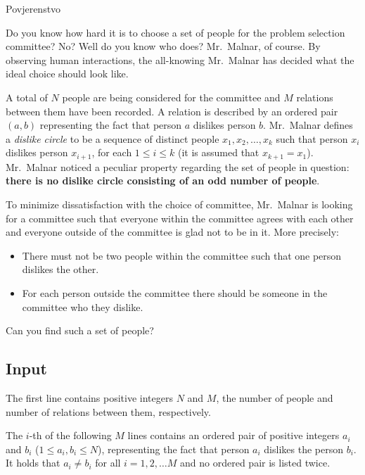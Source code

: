 \begin{statement}[
  problempoints=100,
  timelimit=3 seconds,
  memorylimit=512 MiB,
]{Povjerenstvo}

Do you know how hard it is to choose a set of people for the problem selection 
committee? No? Well do you know who does? Mr.\ Malnar, of course. By observing 
human interactions, the all-knowing Mr.\ Malnar has decided what the ideal 
choice should look like.

A total of $N$ people are being considered for the committee and $M$ relations 
between them have been recorded. A relation is described by an ordered pair 
$(a, b)$ representing the fact that person $a$ dislikes person $b$.  Mr.\ Malnar 
defines a \textit{dislike circle} to be a sequence of distinct people $x_1, x_2, \dots, x_k$
such that person $x_i$ dislikes person $x_{i+1}$, for each $1 \leq i \leq k$ 
(it is assumed that $x_{k+1} = x_1$). Mr.\ Malnar noticed a peculiar property 
regarding the set of people in question: \textbf{there is no dislike circle consisting 
of an odd number of people}.

To minimize dissatisfaction with the choice of committee, Mr.\ Malnar is looking for a 
committee such that everyone within the committee agrees with each other and everyone 
outside of the committee is glad not to be in it. More precisely:
\begin{itemize}
    \item There must not be two people within the committee such that one person dislikes the other.
    \item For each person outside the committee there should be someone in the committee who they dislike.
\end{itemize}

Can you find such a set of people?

\subsection*{Input}

The first line contains positive integers $N$ and $M$, the number of people and number
of relations between them, respectively.

The $i$-th of the following $M$ lines contains an ordered pair of positive 
integers $a_i$ and $b_i$ ($1 \leq a_i, b_i \leq N$), representing the fact 
that person $a_i$ dislikes the person $b_i$. It holds that $a_i \ne b_i$ for 
all $i = 1, 2, \dots M$ and no ordered pair is listed twice.


\end{statement}

